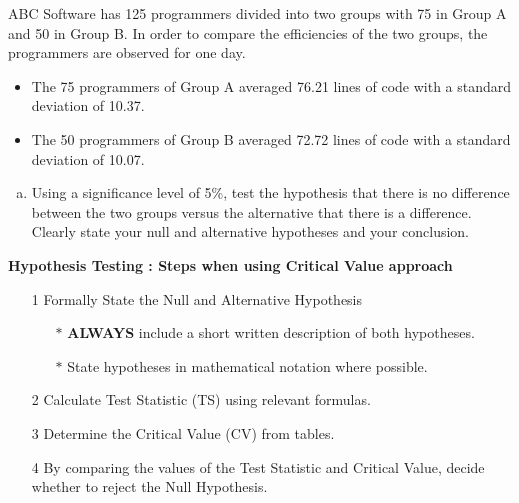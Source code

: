 \documentclass[a4paper,12pt]{article}
\begin{document}
\large 
\noindent ABC Software has 125 programmers divided into two groups with 75 in
Group A and 50 in Group B. In order to compare the efficiencies of the
two groups, the programmers are observed for one day. \begin{itemize} \item The 75
	programmers of Group A averaged 76.21 lines of code with a standard
	deviation of 10.37. \item The 50 programmers of Group B averaged 72.72
	lines of code with a standard deviation of 10.07. \end{itemize}
\begin{enumerate}[(a)]
	\item Using a significance
	level of 5\%, test the hypothesis that there is no difference between the
	two groups versus the alternative that there is a difference. Clearly state
	your null and alternative hypotheses and your conclusion.
\end{enumerate}
\bigskip 

\begin{framed}
		\noindent \textbf{Hypothesis Testing : Steps when using Critical Value approach}
		
		\begin{itemize}
			\item[1] Formally State the Null and Alternative Hypothesis \smallskip
			{
				\begin{itemize}
					\item[$\ast$] \textbf{ALWAYS} include a short written description of both hypotheses.
					\item[$\ast$] State hypotheses in mathematical notation where possible.
					
				\end{itemize}
			}
			\item[2] Calculate Test Statistic (TS) using relevant formulas.\smallskip
			\item[3] Determine the Critical Value (CV) from tables. \smallskip
			\item[4] By comparing the values of the Test Statistic and Critical Value, decide whether to reject the Null Hypothesis.
		\end{itemize}
	\end{framed}
\newpage 
\end{document}
